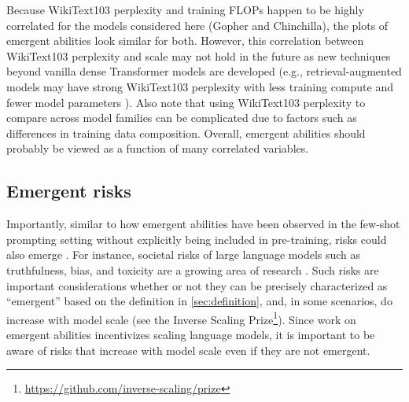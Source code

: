 Because WikiText103 perplexity and training FLOPs happen to be highly correlated for the models considered here (Gopher and Chinchilla), the plots of emergent abilities look similar for both. However, this correlation between WikiText103 perplexity and scale may not hold in the future as new techniques beyond vanilla dense Transformer models are developed (e.g., retrieval-augmented models may have strong WikiText103 perplexity with less training compute and fewer model parameters \citep{borgeaud2021improving}). Also note that using WikiText103 perplexity to compare across model families can be complicated due to factors such as differences in training data composition. Overall, emergent abilities should probably be viewed as a function of many correlated variables.

\subsection{Emergent risks}\label{subsec:emergent-risks}
Importantly, similar to how emergent abilities have been observed in the few-shot prompting setting without explicitly being included in pre-training, risks could also emerge \citep{bommasani2021opportunities,jacobsrisks,ganguli2022predictability}. For instance, societal risks of large language models such as truthfulness, bias, and toxicity are a growing area of research \citep{weidinger2021ethical}. Such risks are important considerations whether or not they can be precisely characterized as ``emergent'' based on the definition in \ref{sec:definition}, and, in some scenarios, do increase with model scale (see the Inverse Scaling Prize\footnote{\url{https://github.com/inverse-scaling/prize}}).
Since work on emergent abilities incentivizes scaling language models, it is important to be aware of risks that increase with model scale even if they are not emergent. 

